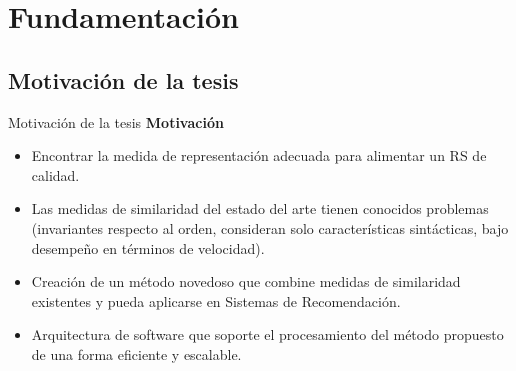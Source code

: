 \section{Fundamentación}

\subsection{Motivación de la tesis}
\begin{frame}{Motivación de la tesis}
	\textbf{Motivación}
	\bigskip
	\begin{itemize} [<+>]
		\item Encontrar la medida de representación adecuada para alimentar un RS de calidad.
		\item Las medidas de similaridad del estado del arte tienen conocidos problemas (invariantes respecto al orden, consideran solo características sintácticas, bajo desempeño en términos de velocidad).
		\item Creación de un método novedoso que combine medidas de similaridad existentes y pueda aplicarse en Sistemas de Recomendación.
		\item Arquitectura de software que soporte el procesamiento del método propuesto de una forma eficiente y escalable.
	\end{itemize}
\end{frame}